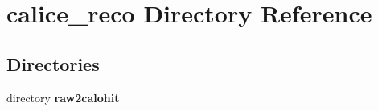 \section{calice\-\_\-reco Directory Reference}
\label{dir_aa5152576b83acadfecf1e9f3e210c0e}
\subsection*{Directories}
\begin{DoxyCompactItemize}
\item 
directory {\bf raw2calohit}
\end{DoxyCompactItemize}

